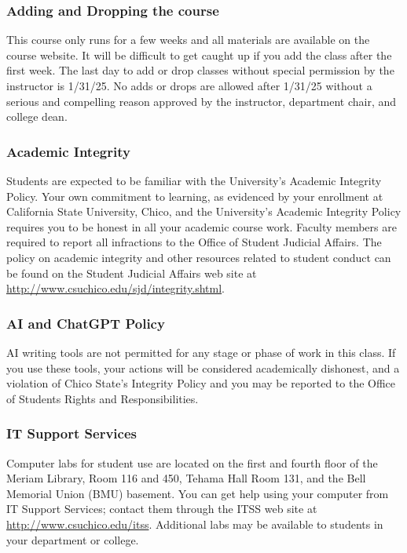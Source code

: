 \documentclass[
  11pt,
]{article}
\begin{document}
\subsubsection{Adding and Dropping the
course}\label{adding-and-dropping-the-course}

This course only runs for a few weeks and all materials are available on
the course website. It will be difficult to get caught up if you add the
class after the first week. The last day to add or drop classes without
special permission by the instructor is 1/31/25. No adds or drops are
allowed after 1/31/25 without a serious and compelling reason approved
by the instructor, department chair, and college dean.

\subsubsection{Academic Integrity}\label{academic-integrity}

Students are expected to be familiar with the University's Academic
Integrity Policy. Your own commitment to learning, as evidenced by your
enrollment at California State University, Chico, and the University's
Academic Integrity Policy requires you to be honest in all your academic
course work. Faculty members are required to report all infractions to
the Office of Student Judicial Affairs. The policy on academic integrity
and other resources related to student conduct can be found on the
Student Judicial Affairs web site at
\url{http://www.csuchico.edu/sjd/integrity.shtml}.

\subsubsection{AI and ChatGPT Policy}\label{ai-and-chatgpt-policy}

AI writing tools are not permitted for any stage or phase of work in
this class. If you use these tools, your actions will be considered
academically dishonest, and a violation of Chico State's Integrity
Policy and you may be reported to the Office of Students Rights and
Responsibilities.

\subsubsection{IT Support Services}\label{it-support-services}

Computer labs for student use are located on the first and fourth floor
of the Meriam Library, Room 116 and 450, Tehama Hall Room 131, and the
Bell Memorial Union (BMU) basement. You can get help using your computer
from IT Support Services; contact them through the ITSS web site at
\url{http://www.csuchico.edu/itss}. Additional labs may be available to
students in your department or college.
\end{document}
